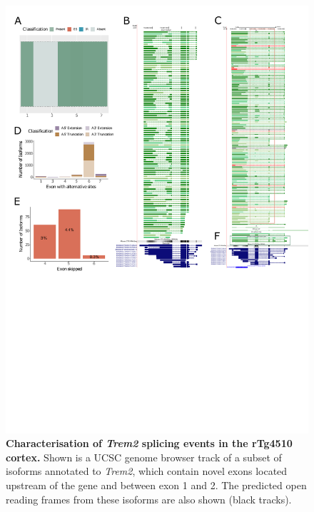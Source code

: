 \begin{figure}[htp]
	\centering
	\captionsetup{width=0.95\textwidth}
	\includegraphics[page=8,trim={1cm 23cm 0 0},scale = 0.84]{Figures/TargetGenes_Annotation_Portrait.pdf}
	\caption[Characterisation of \textit{Trem2} novel exons]%
	{\textbf{Characterisation of \textit{Trem2} splicing events in the rTg4510 cortex.} Shown is a UCSC genome browser track of a subset of isoforms annotated to \textit{Trem2}, which contain novel exons located upstream of the gene and between exon 1 and 2. The predicted open reading frames from these isoforms are also shown (black tracks).}    
	\label{fig:trem2_orf}
\end{figure}




